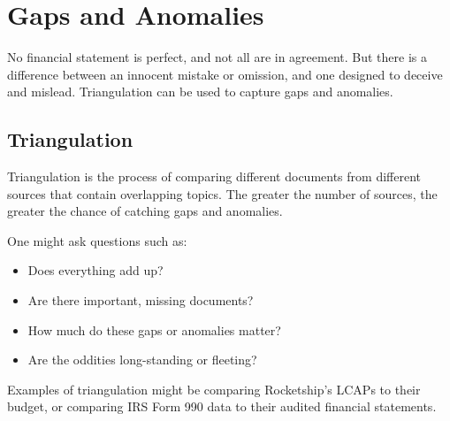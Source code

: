 \newpage
\section{Gaps and Anomalies}\label{sec:gaps-anomalies}\indent%

No financial statement is perfect, and not all are in agreement. But there is a difference between an innocent mistake or omission, and one designed to deceive and mislead. Triangulation can be used to capture gaps and anomalies.

\subsection{Triangulation}\label{sec:triangulation}\indent%

Triangulation is the process of comparing different documents from different sources that contain overlapping topics. The greater the number of sources, the greater the chance of catching gaps and anomalies.

One might ask questions such as:
\begin{itemize}
  \item Does everything add up? 
  \item Are there important, missing documents? 
  \item How much do these gaps or anomalies matter? 
  \item Are the oddities long-standing or fleeting? 
\end{itemize}
Examples of triangulation might be comparing Rocketship's LCAPs to their budget, or comparing IRS Form 990 data to their audited financial statements.


